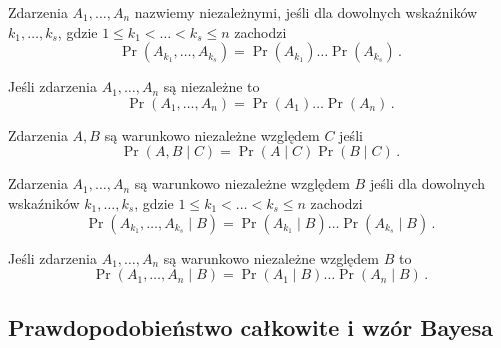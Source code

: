 \documentclass{myclass}
\numberwithin{equation}{subsection}
\begin{document}
\begin{definition}
Zdarzenia \(A_1,\ldots,A_n\) nazwiemy niezależnymi, jeśli dla dowolnych wskaźników
\(k_1,\ldots,k_s\), gdzie \(1 \leq k_1 < \ldots < k_s \leq n\) zachodzi
\begin{equation*}
    \Pr(A_{k_1},\ldots,A_{k_s}) = \Pr(A_{k_1}) \ldots \Pr(A_{k_s})\,.
\end{equation*}
\end{definition}

\begin{theorem}
Jeśli zdarzenia \(A_1,\ldots,A_n\) są niezależne to
\begin{equation*}
    \Pr(A_1,\ldots,A_n) = \Pr(A_1) \ldots \Pr(A_n)\,.
\end{equation*}
\end{theorem}

\begin{definition}
Zdarzenia \(A,B\) są warunkowo niezależne względem \(C\) jeśli
\begin{equation*}
    \Pr(A,B \mid C) = \Pr(A \mid C) \Pr(B \mid C)\,.
\end{equation*}
\end{definition}

\begin{definition}
Zdarzenia \(A_1,\ldots,A_n\) są warunkowo niezależne względem \(B\) jeśli dla dowolnych wskaźników
\(k_1,\ldots,k_s\), gdzie \(1 \leq k_1 < \ldots < k_s \leq n\) zachodzi
\begin{equation*}
    \Pr(A_{k_1},\ldots,A_{k_s} \mid B) = \Pr(A_{k_1} \mid B) \ldots \Pr(A_{k_s} \mid B)\,.
\end{equation*}
\end{definition}

\begin{theorem}
Jeśli zdarzenia \(A_1,\ldots,A_n\) są warunkowo niezależne względem \(B\) to
\begin{equation*}
    \Pr(A_1,\ldots,A_n \mid B) = \Pr(A_1 \mid B) \ldots \Pr(A_n \mid B)\,.
\end{equation*}
\end{theorem}


\subsection{Prawdopodobieństwo całkowite i wzór Bayesa}
\end{document}
